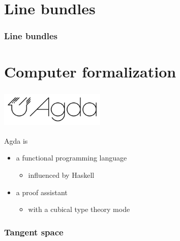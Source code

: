 \documentclass[aspectratio=1610]{beamer}
\begin{document}
\section{Line bundles}

\begin{frame}
  \frametitle{Line bundles}
\end{frame}

\section{Computer formalization}

\begin{frame}
  \frametitle{\includegraphics[width=5cm]{./images/agda-logo.png}}

  Agda is
  \begin{itemize}
    \item
      a functional programming language
      \begin{itemize}
        \item
          influenced by Haskell
      \end{itemize}
    \item
      a proof assistant
      \begin{itemize}
        \item
          with a \alert{cubical type theory} mode
      \end{itemize}
  \end{itemize}
\end{frame}

\begin{frame}
  \frametitle{Tangent space}
\end{frame}
\end{document}
